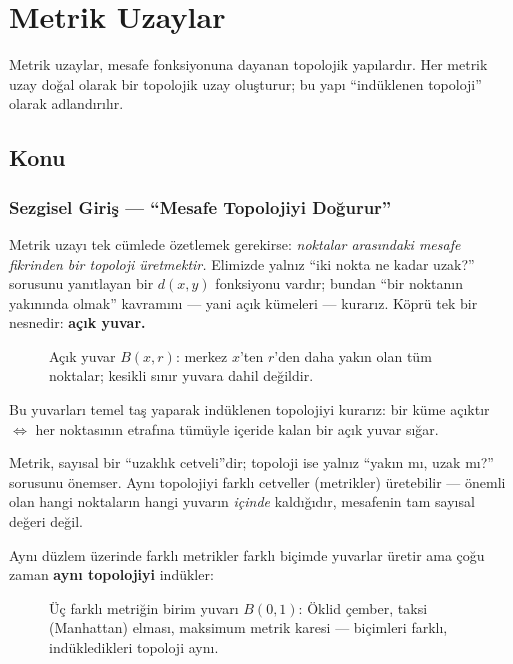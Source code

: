\chapter{Metrik Uzaylar}

Metrik uzaylar, mesafe fonksiyonuna dayanan topolojik yapılardır. Her metrik uzay
doğal olarak bir topolojik uzay oluşturur; bu yapı ``indüklenen topoloji'' olarak adlandırılır.

\section{Konu}

\subsection{Sezgisel Giriş — ``Mesafe Topolojiyi Doğurur''}

Metrik uzayı tek cümlede özetlemek gerekirse: \emph{noktalar arasındaki mesafe
fikrinden bir topoloji üretmektir.} Elimizde yalnız ``iki nokta ne kadar uzak?''
sorusunu yanıtlayan bir $d(x,y)$ fonksiyonu vardır; bundan ``bir noktanın yakınında
olmak'' kavramını --- yani açık kümeleri --- kurarız. Köprü tek bir nesnedir:
\textbf{açık yuvar.}

\begin{figure}[ht]
  \centering
  
  \caption{Açık yuvar $B(x,r)$: merkez $x$'ten $r$'den daha yakın olan tüm
    noktalar; kesikli sınır yuvara dahil değildir.}
\end{figure}

Bu yuvarları temel taş yaparak indüklenen topolojiyi kurarız: bir küme açıktır
$\Leftrightarrow$ her noktasının etrafına tümüyle içeride kalan bir açık yuvar sığar.

\begin{sezgi}
Metrik, sayısal bir ``uzaklık cetveli''dir; topoloji ise yalnız ``yakın mı, uzak
mı?'' sorusunu önemser. Aynı topolojiyi farklı cetveller (metrikler) üretebilir ---
önemli olan hangi noktaların hangi yuvarın \emph{içinde} kaldığıdır, mesafenin tam
sayısal değeri değil.
\end{sezgi}

Aynı düzlem üzerinde farklı metrikler farklı biçimde yuvarlar üretir ama çoğu zaman
\textbf{aynı topolojiyi} indükler:

\begin{figure}[ht]
  \centering
  
  \caption{Üç farklı metriğin birim yuvarı $B(0,1)$: Öklid çember, taksi
    (Manhattan) elması, maksimum metrik karesi --- biçimleri farklı, indükledikleri
    topoloji aynı.}
\end{figure}

